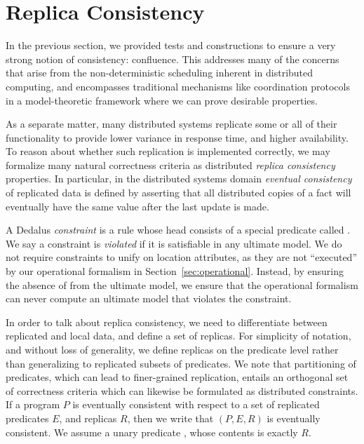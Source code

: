 \section{Replica Consistency}
\label{sec:consistency}

In the previous section, we provided tests and constructions to ensure a very strong notion of consistency: confluence.  This addresses many of the concerns that arise from the non-deterministic scheduling inherent in distributed computing, and encompasses traditional mechanisms like coordination protocols in a model-theoretic framework where we can prove desirable properties.

As a separate matter, many distributed systems replicate some or all of their functionality to provide lower variance in response time, and higher availability.  
To reason about whether such replication is implemented correctly, we may formalize many
natural correctness criteria as distributed {\em replica consistency} properties.
In particular, in the distributed systems domain {\em eventual consistency} of replicated data is defined by asserting that all distributed copies of a fact will eventually have the same value after the last update is made. 

\begin{definition}
A Dedalus {\em constraint} is a rule whose head consists of a special predicate called .  We say a constraint is {\em violated} if it is satisfiable in any ultimate model.  We do not require constraints to unify on location attributes, as they are not ``executed'' by our operational formalism in Section~\ref{sec:operational}.  Instead, by ensuring the absence of  from the ultimate model, we ensure that the operational formalism can never compute an ultimate model that violates the constraint.
\end{definition}

In order to talk about replica consistency, we need to differentiate between replicated
and local
data, and define a set of replicas.  
For simplicity of notation, and without loss of generality, we define replicas on the predicate level rather than generalizing to replicated subsets of predicates.  
We note that partitioning of predicates, which can lead to finer-grained replication, 
entails an orthogonal set of correctness criteria which can likewise be formulated as
distributed constraints.
If a \lang program $P$ is eventually consistent with respect to a set of replicated predicates $E$, and replicas $R$, then we write that $(P, E, R)$ is eventually consistent.  We assume a unary predicate , whose contents is exactly $R$.

